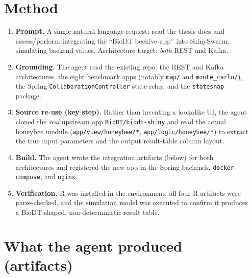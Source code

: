 \documentclass[12pt,a4paper]{article}
\begin{document}
\section{Method}

\begin{enumerate}[nosep]
  \item \textbf{Prompt.} A single natural-language request: read the thesis docs
    and assess/perform integrating the ``BioDT beehive app'' into ShinySwarm,
    simulating backend values. Architecture target: \emph{both} REST and Kafka.
  \item \textbf{Grounding.} The agent read the existing repo: the REST and Kafka
    architectures, the eight benchmark apps (notably \texttt{map/} and
    \texttt{monte\_carlo/}), the Spring \texttt{CollaborationController} state
    relay, and the \texttt{statesnap} package.
  \item \textbf{Source re-use (key step).} Rather than inventing a lookalike UI,
    the agent cloned the \emph{real} upstream app \texttt{BioDT/biodt-shiny} and
    read the actual honeybee module (\texttt{app/view/honeybee/*},
    \texttt{app/logic/honeybee/*}) to extract the true input parameters and the
    output result-table column layout.
  \item \textbf{Build.} The agent wrote the integration artifacts (below) for
    both architectures and registered the new app in the Spring backends,
    \texttt{docker-compose}, and \texttt{nginx}.
  \item \textbf{Verification.} R was installed in the environment; all four R
    artifacts were parse-checked, and the simulation model was executed to
    confirm it produces a BioDT-shaped, non-deterministic result table.
\end{enumerate}

\section{What the agent produced (artifacts)}
\end{document}
